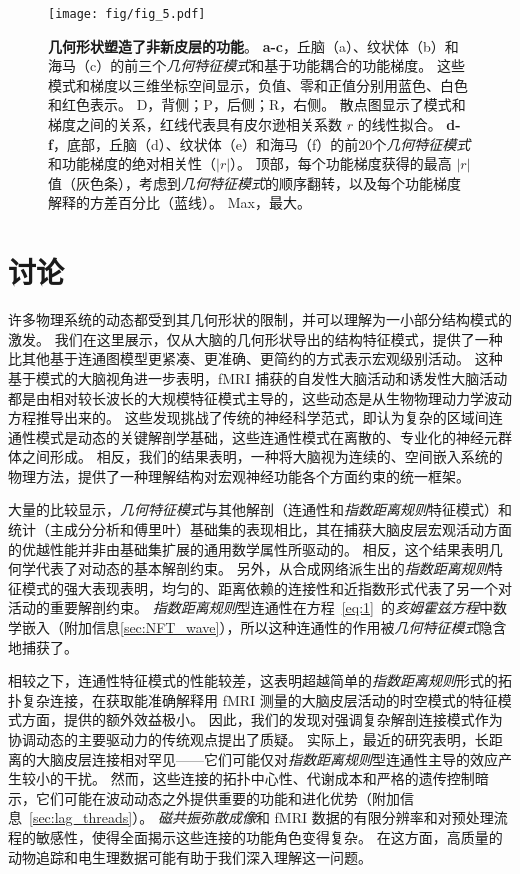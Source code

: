 \documentclass[lang=cn,a4paper,newtx,citestyle=gb7714-2015, bibstyle=gb7714-2015]{elegantpaper}
\begin{document}
\begin{figure}[!htb]
	\centering
	\texttt{[image: fig/fig\_5.pdf]}
	\caption{\textbf{几何形状塑造了非新皮层的功能}。
		\textbf{a-c}，丘脑（a）、纹状体（b）和海马（c）的前三个\textit{几何特征模式}和基于功能耦合的功能梯度。
		这些模式和梯度以三维坐标空间显示，负值、零和正值分别用蓝色、白色和红色表示。
		D，背侧；P，后侧；R，右侧。
		散点图显示了模式和梯度之间的关系，红线代表具有皮尔逊相关系数 $ r $ 的线性拟合。
		\textbf{d-f}，底部，丘脑（d）、纹状体（e）和海马（f）的前20个\textit{几何特征模式}和功能梯度的绝对相关性（$ |r| $）。
		顶部，每个功能梯度获得的最高 $ |r| $ 值（灰色条），考虑到\textit{几何特征模式}的顺序翻转，以及每个功能梯度解释的方差百分比（蓝线）。
		Max，最大。
	} \label{fig:5}
\end{figure}



\section{讨论}

许多物理系统的动态都受到其几何形状的限制，并可以理解为一小部分结构模式的激发。
我们在这里展示，仅从大脑的几何形状导出的结构特征模式，提供了一种比其他基于连通图模型更紧凑、更准确、更简约的方式表示宏观级别活动。
这种基于模式的大脑视角进一步表明，fMRI 捕获的自发性大脑活动和诱发性大脑活动都是由相对较长波长的大规模特征模式主导的，这些动态是从生物物理动力学波动方程推导出来的。
这些发现挑战了传统的神经科学范式，即认为复杂的区域间连通性模式是动态的关键解剖学基础，这些连通性模式在离散的、专业化的神经元群体之间形成。
相反，我们的结果表明，一种将大脑视为连续的、空间嵌入系统的物理方法，提供了一种理解结构对宏观神经功能各个方面约束的统一框架。


大量的比较显示，\textit{几何特征模式}与其他解剖（连通性和\textit{指数距离规则}特征模式）和统计（主成分分析和傅里叶）基础集的表现相比，其在捕获大脑皮层宏观活动方面的优越性能并非由基础集扩展的通用数学属性所驱动的。
相反，这个结果表明几何学代表了对动态的基本解剖约束。
另外，从合成网络派生出的\textit{指数距离规则}特征模式的强大表现表明，均匀的、距离依赖的连接性和近指数形式代表了另一个对活动的重要解剖约束。
\textit{指数距离规则}型连通性在方程~\ref{eq:1}~的\textit{亥姆霍兹方程}中数学嵌入（附加信息\ref{sec:NFT_wave}），所以这种连通性的作用被\textit{几何特征模式}隐含地捕获了。


相较之下，连通性特征模式的性能较差，这表明超越简单的\textit{指数距离规则}形式的拓扑复杂连接，在获取能准确解释用 fMRI 测量的大脑皮层活动的时空模式的特征模式方面，提供的额外效益极小。
因此，我们的发现对强调复杂解剖连接模式作为协调动态的主要驱动力的传统观点提出了质疑。
实际上，最近的研究表明，长距离的大脑皮层连接相对罕见——它们可能仅对\textit{指数距离规则}型连通性主导的效应产生较小的干扰。
然而，这些连接的拓扑中心性、代谢成本和严格的遗传控制暗示，它们可能在波动动态之外提供重要的功能和进化优势（附加信息~\ref{sec:lag_threads}）。
\textit{磁共振弥散成像}和 fMRI 数据的有限分辨率和对预处理流程的敏感性，使得全面揭示这些连接的功能角色变得复杂。
在这方面，高质量的动物追踪和电生理数据可能有助于我们深入理解这一问题。
\end{document}
